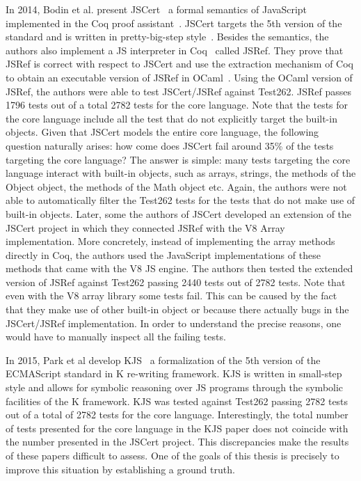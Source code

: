\documentclass[runningheads]{llncs}
\begin{document}
In 2014, Bodin et al. present JSCert~\cite{JSCert-2014} a formal semantics of JavaScript implemented in the Coq proof assistant~\cite{Coq}. JSCert targets the 5th version of the standard and is written in pretty-big-step style~\cite{Arthur-Chargueraud_ESOP_2013}. Besides the semantics, the authors also implement a JS interpreter in Coq~\cite{Coq} called JSRef. They prove that JSRef is correct with respect to JSCert and use the extraction mechanism of Coq to obtain an executable version of JSRef in OCaml~\cite{OCaml}. Using the OCaml version of JSRef, the authors were able to test JSCert/JSRef against Test262. JSRef passes 1796 tests out of a total 2782 tests for the core language. Note that the tests for the core language include all the test that do not explicitly target the built-in objects. Given that JSCert models the entire core language, the following question naturally arises: how come does JSCert fail around 35\% of the tests targeting the core language? The answer is simple: many tests targeting the core language interact with built-in objects, such as arrays, strings, the methods of the Object object, the methods of the Math object etc. Again, the authors were not able to automatically filter the Test262 tests for the tests that do not make use of built-in objects.
%
Later, some the authors of JSCert developed an extension of the JSCert project in which they connected JSRef with the V8 Array implementation. More concretely, instead of implementing the array methods directly in Coq, the authors used the JavaScript implementations of these methods that came with the V8 JS engine. The authors then tested the extended version of JSRef against Test262 passing 2440 tests out of 2782 tests. Note that even with the V8 array library some tests fail. This can be caused by the fact that they make use of other built-in object or because there actually bugs in the JSCert/JSRef implementation. In order to understand the precise reasons, one would have to manually inspect all the failing tests.

In 2015, Park et al develop KJS~\cite{KJS-2015} a formalization of the 5th version of the ECMAScript standard in K re-writing framework. KJS is written in small-step style and allows for symbolic reasoning over JS programs through the symbolic facilities of the K framework. KJS was tested against Test262 passing  2782 tests out of a total of 2782 tests for the core language. Interestingly, the total number of tests presented for the core language in the KJS paper does not coincide with the number presented in the JSCert project. This discrepancies make the results of these papers difficult to assess. One of the goals of this thesis is precisely to improve this situation by establishing a ground truth.
\end{document}
